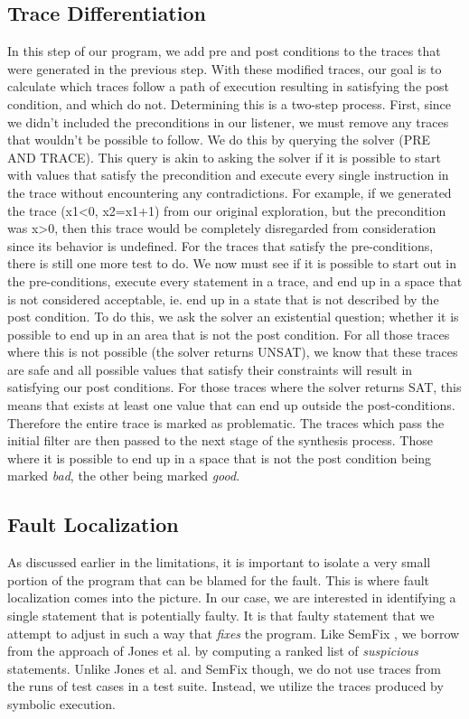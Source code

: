 \documentclass[]{article}
\begin{document}
\subsection{Trace Differentiation}
In this step of our program, we add pre and post conditions to the traces
that were generated in the previous step.  With these modified traces, our goal is to
 calculate which traces follow a path of execution resulting in satisfying the post condition, and which do not.  Determining this is a two-step process.  First, since we didn't included the
preconditions in our listener, we must remove any traces that wouldn't be
possible to follow.  We do this by querying the solver (PRE AND TRACE).  This
query is akin to asking the solver if it is possible to start with values that
satisfy the precondition and execute every single instruction in the trace
without encountering any contradictions.  For example, if we generated the
trace (x1<0, x2=x1+1) from our original exploration, but the precondition
was x>0, then this trace would be completely disregarded from consideration
since its behavior is undefined.  For the traces that satisfy the
pre-conditions, there is still one more test to do.  We now must see if it
is possible to start out in the pre-conditions, execute every statement in a
trace, and end up in a space that is not considered acceptable, ie. end up
in a state that is not described by the post condition.  To do this, we ask
the solver an existential question; whether it is possible to end up in an
area that is not the post condition.  For all those traces where this is not
possible (the solver returns UNSAT), we know that these traces are safe and
all possible values that satisfy their constraints will result in satisfying
our post conditions.  For those traces where the solver returns SAT, this
means that exists at least one value that can end up outside the
post-conditions.  Therefore the entire trace is marked as problematic.  The
traces which pass the initial filter are then passed to the next stage of
the synthesis process.  Those where it is possible to end up in a space that
is not the post condition being marked \emph{bad}, the other being marked
\emph{good}.

\subsection{Fault Localization}

As discussed earlier in the limitations, it is important to isolate a very
small portion of the program that can be blamed for the fault. This is where
fault localization comes into the picture. In our case, we are interested in
identifying a single statement that is potentially faulty. It is that faulty
statement that we attempt to adjust in such a way that \emph{fixes} the
program. Like SemFix \cite{SemFix}, we borrow from the approach of Jones et al.
\cite{JonesTarantula} by computing a ranked list of \emph{suspicious}
statements. Unlike Jones et al. and SemFix though, we do not use traces from
the runs of test cases in a test suite. Instead, we utilize the traces
produced by symbolic execution.
\end{document}
